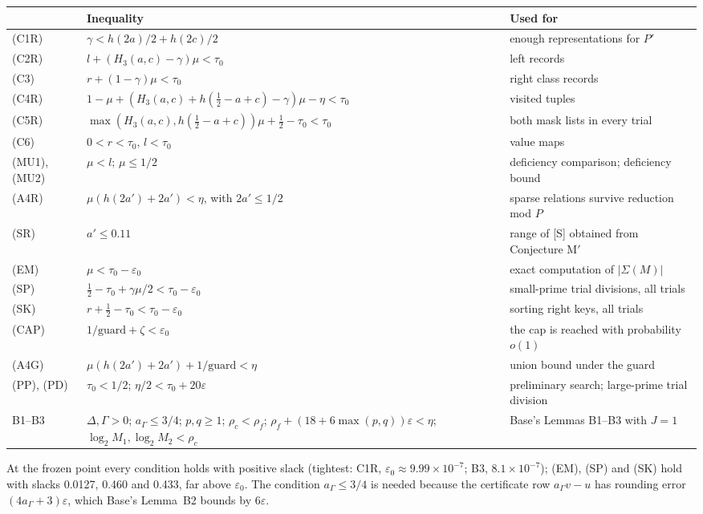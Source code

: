 \documentclass[11pt]{article}
\newcommand{\eps}{\varepsilon}
\theoremstyle{plain}
\begin{document}
\begin{center}
\small
\begin{tabularx}{\linewidth}{>{\raggedright\arraybackslash}p{1.4cm} L >{\raggedright\arraybackslash}p{4.4cm}}
\toprule
& Inequality & Used for \\
\midrule
(C1R) & $\gamma < h(2a)/2 + h(2c)/2$ & enough representations for $P'$ \\
(C2R) & $l + (H_3(a,c) - \gamma)\mu < \tau_0$ & left records \\
(C3) & $r + (1-\gamma)\mu < \tau_0$ & right class records \\
(C4R) & $1 - \mu + (H_3(a,c) + h(\tfrac12 - a + c) - \gamma)\mu - \eta < \tau_0$ & visited tuples \\
(C5R) & $\max(H_3(a,c), h(\tfrac12 - a + c))\mu + \tfrac12 - \tau_0 < \tau_0$ & both mask lists in every trial \\
(C6) & $0 < r < \tau_0$, $l < \tau_0$ & value maps \\
(MU1), (MU2) & $\mu < l$; $\mu \le 1/2$ & deficiency comparison; deficiency bound \\
(A4R) & $\mu(h(2a') + 2a') < \eta$, with $2a' \le 1/2$ & sparse relations survive reduction mod $P$ \\
(SR) & $a' \le 0.11$ & range of [S] obtained from Conjecture M$'$ \\
(EM) & $\mu < \tau_0 - \eps_0$ & exact computation of $|\Sigma(M)|$ \\
(SP) & $\tfrac12 - \tau_0 + \gamma\mu/2 < \tau_0 - \eps_0$ & small-prime trial divisions, all trials \\
(SK) & $r + \tfrac12 - \tau_0 < \tau_0 - \eps_0$ & sorting right keys, all trials \\
(CAP) & $1/\mathrm{guard} + \zeta < \eps_0$ & the cap is reached with probability $o(1)$ \\
(A4G) & $\mu(h(2a') + 2a') + 1/\mathrm{guard} < \eta$ & union bound under the guard \\
(PP), (PD) & $\tau_0 < 1/2$; $\eta/2 < \tau_0 + 20\eps$ & preliminary search; large-prime trial division \\
B1--B3 & $\Delta, \Gamma > 0$; $a_\Gamma \le 3/4$; $p, q \ge 1$; $\rho_c < \rho_f$; $\rho_f + (18 + 6\max(p,q))\eps < \eta$; $\log_2 M_1, \log_2 M_2 < \rho_c$ & Base's Lemmas B1--B3 with $J = 1$ \\
\bottomrule
\end{tabularx}
\end{center}

At the frozen point every condition holds with positive slack (tightest: C1R, $\eps_0\approx9.99\times10^{-7}$; B3, $8.1\times10^{-7}$); (EM), (SP) and (SK) hold with slacks 0.0127, 0.460 and 0.433, far above $\eps_0$. The condition $a_\Gamma \le 3/4$ is needed because the certificate row $a_\Gamma v - u$ has rounding error $(4a_\Gamma + 3)\eps$, which Base's Lemma~B2 bounds by $6\eps$.
\end{document}
